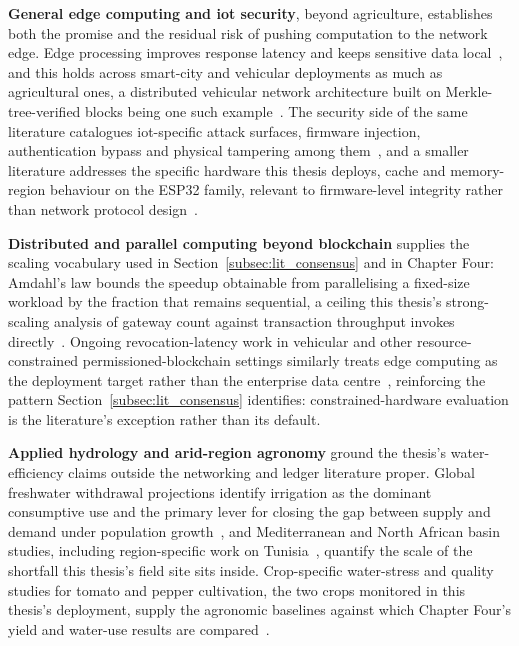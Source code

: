 \documentclass[12pt,a4paper,oneside]{book}
\begin{document}
\textbf{General edge computing and \gls{iot} security}, beyond agriculture,
establishes both the promise and the residual risk of pushing computation
to the network edge. Edge processing improves response latency and keeps
sensitive data local~\cite{sharma2020edge, liu2019edge, wang2021edge}, and
this holds across smart-city and vehicular deployments as much as
agricultural ones, a distributed vehicular network architecture built on
Merkle-tree-verified blocks being one such
example~\cite{sharma2018merkle}. The security side of the same literature
catalogues \gls{iot}-specific attack surfaces, firmware injection,
authentication bypass and physical tampering among
them~\cite{hassan2019iotSecurity, ali2022secureIOT, anderson2021iotBlockchain,
kalaimathi2025injection, akande2018iotChallenges, knight2025iotResilience,
bashir2023IoTWear}, and a smaller literature addresses the specific
hardware this thesis deploys, cache and memory-region behaviour on the
ESP32 family, relevant to firmware-level integrity rather than network
protocol design~\cite{kumari2025rom, csdn_esp32s3_cache, esp_hal_cache}.

\textbf{Distributed and parallel computing beyond blockchain} supplies the
scaling vocabulary used in Section~\ref{subsec:lit_consensus} and in
Chapter Four: Amdahl's law bounds the speedup obtainable from
parallelising a fixed-size workload by the fraction that remains
sequential, a ceiling this thesis's strong-scaling analysis of gateway
count against transaction throughput invokes
directly~\cite{amdahl1967validity}. Ongoing revocation-latency work in
vehicular and other resource-constrained permissioned-blockchain settings
similarly treats edge computing as the deployment target rather than the
enterprise data centre~\cite{lu2022revocation}, reinforcing the pattern
Section~\ref{subsec:lit_consensus} identifies: constrained-hardware
evaluation is the literature's exception rather than its default.

\textbf{Applied hydrology and arid-region agronomy} ground the thesis's
water-efficiency claims outside the networking and ledger literature
proper. Global freshwater withdrawal projections identify irrigation as
the dominant consumptive use and the primary lever for closing the gap
between supply and demand under
population growth~\cite{fao2050, un_water2023}, and Mediterranean and North
African basin studies, including region-specific work on
Tunisia~\cite{tunisia_water_report, adeloye2021tunisiaAgro,
benali2024tunisiaWater, shanhong2021water}, quantify the scale of the
shortfall this thesis's field site sits inside. Crop-specific water-stress
and quality studies for tomato and pepper cultivation, the two crops
monitored in this thesis's deployment, supply the agronomic baselines
against which Chapter Four's yield and water-use results are
compared~\cite{mdpi_tunisia_tomato, jaeid_pepper, fao_tomato_guide,
safeer2024tomato, wang2025pepper, tia2020waterstress,
pepper2021moisturecontrol, capsicumspacing2017study, precision2020yield,
pepperquality2019irrigation}.
\end{document}
